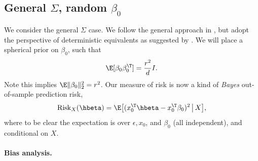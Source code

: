 \documentclass{article}
\begin{document}
\subsection{General $\Sigma$, random $\beta_0$}

We consider the general $\Sigma$ case. We follow the general approach in
\citet{dobriban2018high}, but adopt the perspective of deterministic equivalents
as suggested by \citet{dobriban2021distributed}. We will place a spherical prior on $\beta_0$,
such that       
\begin{equation}
\label{eq:prior}
\E[\beta_0 \beta_0^\T] = \frac{r^2}{d} I.
\end{equation}
Note this implies $\E \|\beta_0\|_2^2 = r^2$. Our measure of risk is now a kind
of \emph{Bayes} out-of-sample prediction risk,  
\begin{equation}
\label{eq:ridge_risk_bayes}
\Risk_X(\hbeta) = \E \big[ ( x_0^\T \hbeta - x_0^\T \beta_0 )^2 \,\big|\,
X \big],
\end{equation}
where to be clear the expectation is over $\epsilon, x_0$, and $\beta_0$ (all
independent), and conditional on $X$. 

\paragraph{Bias analysis.}
\end{document}
